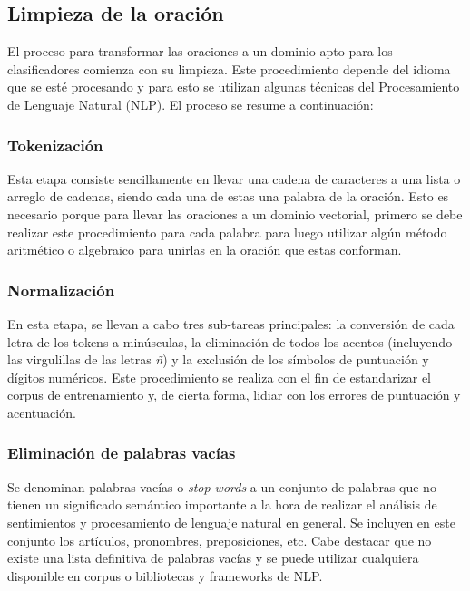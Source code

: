 \documentclass[conference]{IEEEtran}
\begin{document}
    
    \subsection{Limpieza de la oración}
    
    	El proceso para transformar las oraciones a un dominio apto para los clasificadores comienza con su limpieza. Este procedimiento depende del idioma que se esté procesando y para esto se utilizan algunas técnicas del Procesamiento de Lenguaje Natural (NLP). El proceso se resume a continuación:
    	\newline
    	
    	\subsubsection{Tokenización}
    	
    		Esta etapa consiste sencillamente en llevar una cadena de caracteres a una lista o arreglo de cadenas, siendo cada una de estas una palabra de la oración. Esto es necesario porque para llevar las oraciones a un dominio vectorial, primero se debe realizar este procedimiento para cada palabra para luego utilizar algún método aritmético o algebraico para unirlas en la oración que estas conforman.
    		\newline
    	
    	\subsubsection{Normalización}
    	
    		En esta etapa, se llevan a cabo tres sub-tareas principales: la conversión de cada letra de los tokens a minúsculas, la eliminación de todos los acentos (incluyendo las virgulillas de las letras \textit{ñ}) y la exclusión de los símbolos de puntuación y dígitos numéricos. Este procedimiento se realiza con el fin de estandarizar el corpus de entrenamiento y, de cierta forma, lidiar con los errores de puntuación y acentuación.
    		\newline	
    	
    	\subsubsection{Eliminación de palabras vacías}
    	
    		Se denominan palabras vacías o \textit{stop-words} a un conjunto de palabras que no tienen un significado semántico importante a la hora de realizar el análisis de sentimientos y procesamiento de lenguaje natural en general. Se incluyen en este conjunto los artículos, pronombres, preposiciones, etc. Cabe destacar que no existe una lista definitiva de palabras vacías y se puede utilizar cualquiera disponible en corpus o bibliotecas y frameworks de NLP.
    		\newline
    	
\end{document}
